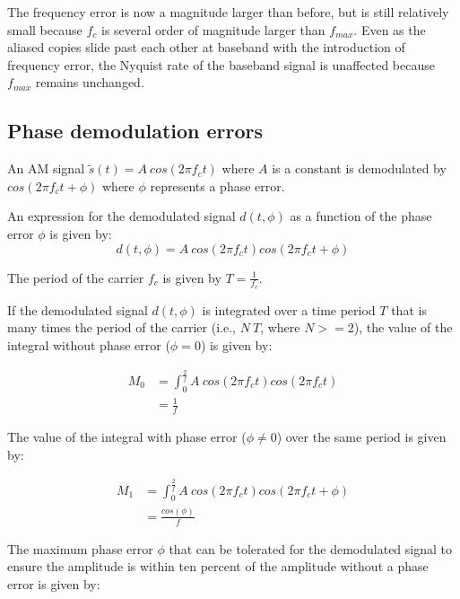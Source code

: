 \documentclass[letterpaper,12pt]{article}
\begin{document}
The frequency error is now a magnitude larger than before, but is still
relatively small because $f_{c}$ is several order of magnitude larger than
$f_{max}$. Even as the aliased copies slide past each other at baseband with
the introduction of frequency error, the Nyquist rate of the baseband signal is
unaffected because $f_{max}$ remains unchanged.
\pagebreak

\subsection{Phase demodulation errors}

An AM signal $\tilde{s}(t)=A\ cos(2 \pi f_{c}t)$ where $A$ is a constant is
demodulated by $cos(2 \pi f_{c}t+\phi)$ where $\phi$ represents a phase error.

An expression for the demodulated signal $d(t,\phi)$ as a function of the phase
error $\phi$ is given by:
\begin{equation}
d(t,\phi)=A\ cos(2 \pi f_{c}t)cos(2 \pi f_{c}t+\phi)
\end{equation}

The period of the carrier $f_{c}$ is given by $T=\frac{1}{f_{c}}$.

If the demodulated signal $d(t,\phi)$ is integrated over a time period $T$ that
is many times the period of the carrier (i.e., $N\ T$, where $N >= 2$), the value
of the integral without phase error ($\phi=0$) is given by:

\begin{equation}
\begin{split}
M_{0} & = \int_{0}^{\frac{2}{f}}A\ cos(2\pi f_{c}t)cos(2\pi f_{c}t) \\
 & = \frac{1}{f}
\end{split}
\end{equation}

The value of the integral with phase error ($\phi\neq0$) over the same period is
given by:

\begin{equation}
\begin{split}
M_{1} & = \int_{0}^{\frac{2}{f}}A\ cos(2\pi f_{c}t)cos(2\pi f_{c}t+\phi) \\
 & = \frac{cos(\phi)}{f}
\end{split}
\end{equation}

The maximum phase error $\phi$ that can be tolerated for the demodulated signal
to ensure the amplitude is within ten percent of the amplitude without a phase
error is given by:
\end{document}
